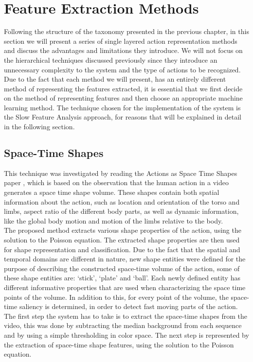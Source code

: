 \documentclass[11pt]{report}
\begin{document}
\section{Feature Extraction Methods}
Following the structure of the taxonomy presented in the previous chapter, in this section we will present a series of single layered action representation methods and discuss the advantages and limitations they introduce. We will not focus on the hierarchical techniques discussed previously since they introduce an unnecessary complexity to the system and the type of actions to be recognized.  \\
Due to the fact that each method we will present, has an entirely different method of representing the features extracted, it is essential that we first decide on the method of representing features and then choose an appropriate machine learning method. The technique chosen for the implementation of the system is the Slow Feature Analysis approach, for reasons that will be explained in detail in the following section. \\ 

\subsection{Space-Time Shapes}
This technique was investigated by reading the Actions as Space Time Shapes paper \cite{s-t-shapes}, which is based on the observation that the human action in a video generates a space time shape volume. These shapes contain both spatial information about the action, such as location and orientation of the torso and limbs, aspect ratio of the different body parts, as well as dynamic information, like the global body motion and motion of the limbs relative to the body. \\
The proposed method extracts various shape properties of the action, using the solution to the Poisson equation. The extracted shape properties are then used for shape representation and classification. Due to the fact that the spatial and temporal domains are different in nature, new shape entities were defined for the purpose of describing the constructed space-time volume of the action, some of these shape entities are: `stick', `plate' and `ball'. Each newly defined entity has different informative properties that are used when characterizing the space time points of the volume. In addition to this, for every point of the volume, the space-time saliency is determined, in order to detect fast moving parts of the action. \\
The first step the system has to take is to extract the space-time shapes from the video, this was done by subtracting the median background from each sequence and by using a simple thresholding in color space. The next step is represented by the extraction of space-time shape features, using the solution to the Poisson equation. \\
\end{document}
